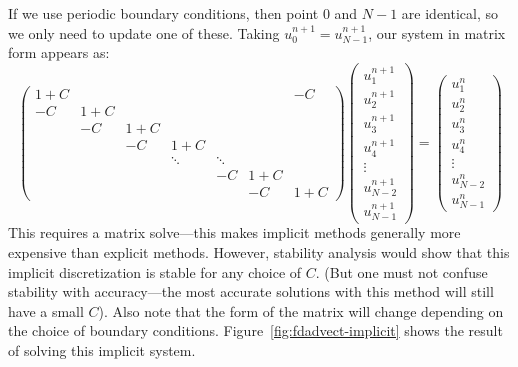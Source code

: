 If we use periodic boundary conditions, then point $0$ and $N-1$ are
identical, so we only need to update one of these.  Taking $u_0^{n+1} = u_{N-1}^{n+1}$, our system in matrix form appears as:
\begin{equation}
\renewcommand{\arraystretch}{1.5}
\left ( \begin{array}{ccccccc} 
1+C & & & & & & -C \\
-C  & 1+C &  \\
 &  -C & 1+C &  \\
 & & -C & 1+C &  \\
&&&\ddots&\ddots &\\
&&&&-C & 1+C & \\
&&&&& -C &1+C
\end{array}
\right )
%
\left ( \begin{array}{c}
u_1^{n+1} \\
u_2^{n+1} \\
u_3^{n+1} \\
u_4^{n+1} \\
\vdots \\
u_{N-2}^{n+1} \\
u_{N-1}^{n+1} 
\end{array}
\right )
=
\left ( \begin{array}{c}
u_1^{n} \\
u_2^{n} \\
u_3^{n} \\
u_4^{n} \\
\vdots \\
u_{N-2}^{n} \\
u_{N-1}^{n} 
\end{array}
\right )
\end{equation}
This requires a matrix solve---this makes implicit methods generally more
expensive than explicit methods.  However, stability analysis would show
that this implicit discretization is stable for any choice of $C$. (But
one must not confuse stability with accuracy---the most accurate solutions
with this method will still have a small $C$).  Also note that the form of 
the matrix will change depending on the choice of boundary conditions.
Figure~\ref{fig:fdadvect-implicit} shows the result of solving this
implicit system.

